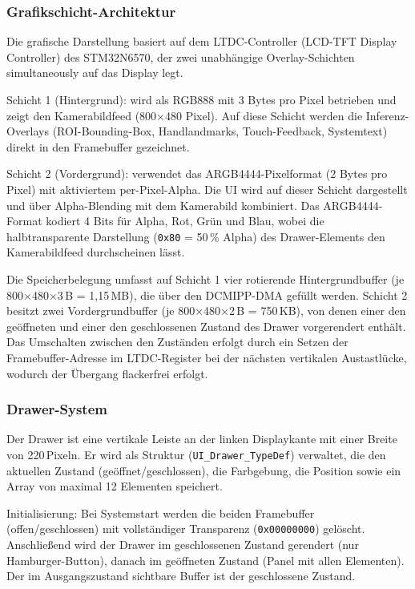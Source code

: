 \subsubsection{Grafikschicht-Architektur}\label{ssub:grafikschicht}

Die grafische Darstellung basiert auf dem LTDC-Controller (LCD-TFT Display Controller) \linebreak des STM32N6570, der zwei unabhängige Overlay-Schichten simultaneously auf das Display legt.

Schicht 1 (Hintergrund): wird als RGB888 mit 3 Bytes pro Pixel betrieben und zeigt den Kamerabildfeed (800$\times$480 Pixel). Auf diese Schicht werden die Inferenz-Overlays (ROI-Bounding-Box, Handlandmarks, Touch-Feedback, Systemtext) direkt in den Framebuffer gezeichnet.

Schicht 2 (Vordergrund): verwendet das ARGB4444-Pixelformat (2 Bytes pro Pixel) mit aktiviertem per-Pixel-Alpha. Die UI wird auf dieser Schicht dargestellt und über Alpha-Blending mit dem Kamerabild kombiniert. Das ARGB4444-Format kodiert 4 Bits für Alpha, Rot, Grün und Blau, wobei die halbtransparente Darstellung (\texttt{0x80} = 50\,\% Alpha) des Drawer-Elements den Kamerabildfeed durchscheinen lässt.

Die Speicherbelegung umfasst auf Schicht 1 vier rotierende Hintergrundbuffer \linebreak (je 800$\times$480$\times$3\,B = 1{,}15\,MB), die über den DCMIPP-DMA gefüllt werden. Schicht 2 besitzt zwei Vordergrundbuffer (je 800$\times$480$\times$2\,B = 750\,KB), von denen einer den geöffneten und einer den geschlossenen Zustand des Drawer vorgerendert enthält. Das Umschalten zwischen den Zuständen erfolgt durch ein Setzen der Framebuffer-Adresse im LTDC-Register bei der nächsten vertikalen Austastlücke, wodurch der Übergang flackerfrei erfolgt.

\subsubsection{Drawer-System}\label{ssub:drawer-system}

Der Drawer ist eine vertikale Leiste an der linken Displaykante mit einer Breite von 220\,Pixeln. Er wird als Struktur (\texttt{UI\_Drawer\_TypeDef}) verwaltet, die den aktuellen Zustand (geöffnet/\-geschlossen), die Farbgebung, die Position sowie ein Array von maximal 12 Elementen speichert.

Initialisierung: Bei Systemstart werden die beiden Framebuffer (offen/geschlossen) mit vollständiger Transparenz (\texttt{0x00000000}) gelöscht. Anschließend wird der Drawer im geschlossenen Zustand gerendert (nur Hamburger-Button), danach im geöffneten Zustand (Panel mit allen Elementen). Der im Ausgangszustand sichtbare Buffer ist der geschlossene Zustand.

